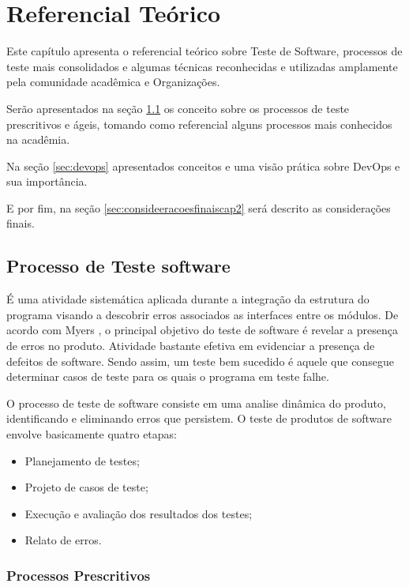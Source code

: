 \chapter{Referencial Teórico}
\label{sec:referencialteorico}

Este capítulo apresenta o referencial teórico sobre Teste de Software, processos de teste mais consolidados e algumas técnicas reconhecidas e utilizadas amplamente pela comunidade acadêmica e Organizações.

Serão apresentados na seção \ref{sec:processotestedesoftware} os conceito sobre os processos de teste prescritivos e ágeis, tomando como referencial alguns processos mais conhecidos na acadêmia.

Na seção \ref{sec:devops} apresentados conceitos e uma visão prática sobre DevOps e sua importância.

E por fim, na seção \ref{sec:consideeracoesfinaiscap2} será descrito as considerações finais.


\section{Processo de Teste software}
\label{sec:processotestedesoftware}

É uma atividade sistemática aplicada durante a integração da estrutura do programa visando a descobrir erros associados as interfaces entre os módulos. De acordo com Myers \cite{myers2004}, o principal objetivo do teste de software é revelar a presença de erros no produto. Atividade bastante efetiva em evidenciar a presença de defeitos de software. Sendo assim, um teste bem sucedido é aquele que consegue determinar casos de teste para os quais o programa em teste falhe.

O processo de teste de software consiste em uma analise dinâmica do produto, identificando e eliminando erros que persistem. O teste de produtos de software envolve basicamente quatro etapas:

\begin{itemize}
    \item Planejamento de testes;
    \item Projeto de casos de teste;
    \item Execução e avaliação dos resultados dos testes;
    \item Relato de erros.
\end{itemize}

\subsection{Processos Prescritivos}

